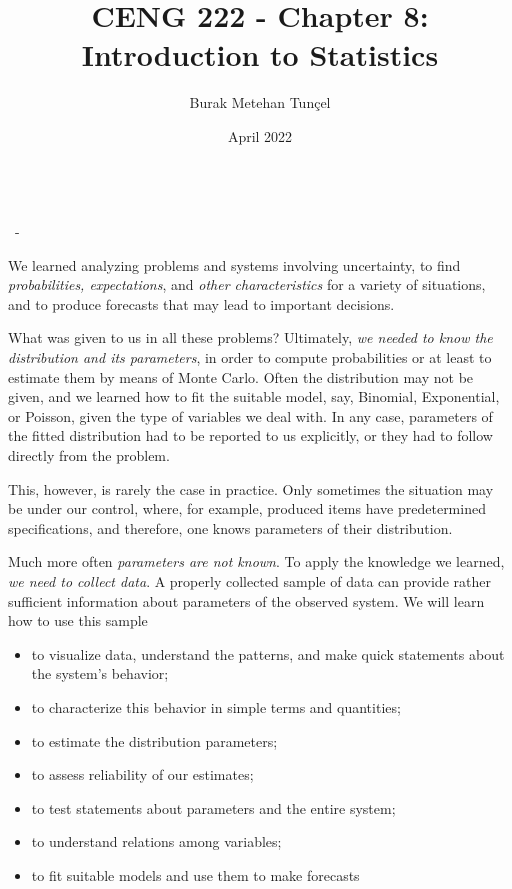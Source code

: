 \documentclass{article}
\title{CENG 222 - Chapter 8: Introduction to Statistics}
\author{Burak Metehan Tunçel}
\date{April 2022}
\makeatletter
\newcounter{example}
\renewcommand\maketitle{
{\raggedright %
\begin{center}
{\Large \bfseries \@title}\\[2ex] 
{\large \@author \ - \@date}\\[2ex]
\end{center}}} %
\makeatother
\begin{document}
\maketitle

\begin{multicols}{2}
  We learned analyzing problems and systems involving uncertainty, to find \textit{probabilities, expectations}, and \textit{other characteristics} for a variety of situations, and to produce forecasts that may lead to important decisions.

  What was given to us in all these problems? Ultimately, \textit{we needed to know the distribution and its parameters}, in order to compute probabilities or at least to estimate them by means of Monte Carlo. Often the distribution may not be given, and we learned how to fit the suitable model, say, Binomial, Exponential, or Poisson, given the type of variables we deal with. In any case, parameters of the fitted distribution had to be reported to us explicitly, or they had to follow directly from the problem.

  This, however, is rarely the case in practice. Only sometimes the situation may be under our control, where, for example, produced items have predetermined specifications, and therefore, one knows parameters of their distribution.

  Much more often \textit{parameters are not known}. To apply the knowledge we learned, \textit{we need to collect data}. A properly collected sample of data can provide rather sufficient information about parameters of the observed system. We will learn how to use this sample
  \begin{itemize}
    \item to visualize data, understand the patterns, and make quick statements about the system's behavior;
    \item to characterize this behavior in simple terms and quantities;
    \item to estimate the distribution parameters;
    \item to assess reliability of our estimates;
    \item to test statements about parameters and the entire system;
    \item to understand relations among variables;
    \item to fit suitable models and use them to make forecasts
  \end{itemize}
\end{multicols}


\end{document}
